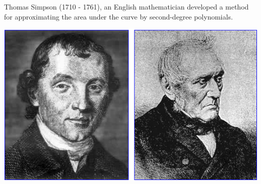 \begin{frame}
\frametitle{}
Thomas Simpson (1710 - 1761), an English mathematician developed a method for approximating the area under the curve by second-degree polynomials. \\
\begin{center}
\includegraphics[width=.7\linewidth]{../../modules/approximate-integration/pictures/Simpson}
\end{center}

\end{frame}
